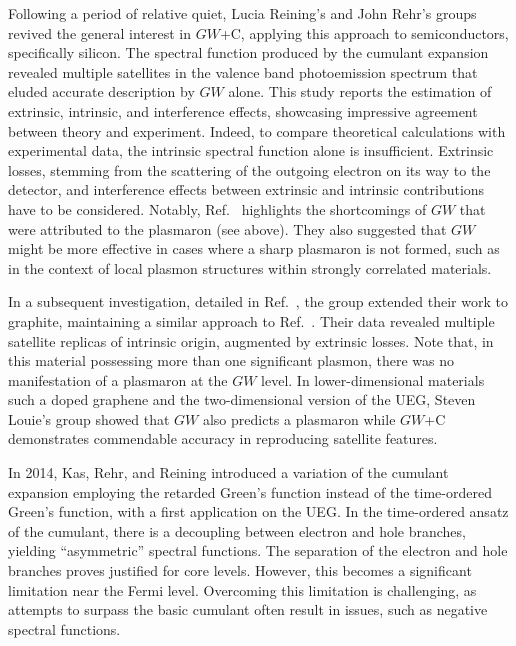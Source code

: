 \documentclass[aip,jcp,reprint,noshowkeys,superscriptaddress]{revtex4-2}
\begin{document}
Following a period of relative quiet, Lucia Reining's and John Rehr's groups revived the general interest in $GW$+C, applying this approach to semiconductors, specifically silicon. \cite{Guzzo_2011} The spectral function produced by the cumulant expansion revealed multiple satellites in the valence band photoemission spectrum that eluded accurate description by $GW$ alone. This study reports the estimation of extrinsic, intrinsic, and interference effects, showcasing impressive agreement between theory and experiment. Indeed, to compare theoretical calculations with experimental data, the intrinsic spectral function alone is insufficient. Extrinsic losses, stemming from the scattering of the outgoing electron on its way to the detector, and interference effects between extrinsic and intrinsic contributions have to be considered. Notably, Ref.~ highlights the shortcomings of $GW$ that were attributed to the plasmaron (see above). They also suggested that $GW$ might be more effective in cases where a sharp plasmaron is not formed, such as in the context of local plasmon structures within strongly correlated materials.

In a subsequent investigation, detailed in Ref.~, the group extended their work to graphite, maintaining a similar approach to Ref.~. Their data revealed multiple satellite replicas of intrinsic origin, augmented by extrinsic losses. Note that, in this material possessing more than one significant plasmon, there was no manifestation of a plasmaron at the $GW$ level.
In lower-dimensional materials such a doped graphene \cite{Lischner_2013} and the two-dimensional version of the UEG, \cite{Lischner_2014} Steven Louie's group showed that $GW$ also predicts a plasmaron while $GW$+C demonstrates commendable accuracy in reproducing satellite features.

In 2014, Kas, Rehr, and Reining introduced a variation of the cumulant expansion employing the retarded Green's function instead of the time-ordered Green's function, with a first application on the UEG. \cite{Kas_2014} In the time-ordered ansatz of the cumulant, there is a decoupling between electron and hole branches, yielding ``asymmetric'' spectral functions. The separation of the electron and hole branches proves justified for core levels. However, this becomes a significant limitation near the Fermi level. Overcoming this limitation is challenging, as attempts to surpass the basic cumulant often result in issues, such as negative spectral functions. \cite{Gunnarsson_1994} 
\end{document}
